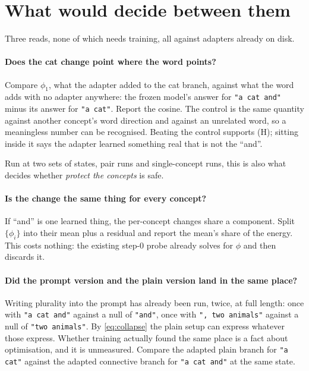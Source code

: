 \documentclass[11pt]{article}
\begin{document}
\section{What would decide between them}

Three reads, none of which needs training, all against adapters already on disk.

\paragraph{Does the cat change point where the word points?}
Compare $\phi_1$, what the adapter added to the cat branch, against what the word adds with no
adapter anywhere: the frozen model's answer for \texttt{"a cat and"} minus its answer for
\texttt{"a cat"}. Report the cosine. The control is the same quantity against another concept's word
direction and against an unrelated word, so a meaningless number can be recognised. Beating the
control supports (H); sitting inside it says the adapter learned something real that is not the
``and''.

Run at two sets of states, pair runs and single-concept runs, this is also what decides whether
\emph{protect the concepts} is safe.

\paragraph{Is the change the same thing for every concept?}
If ``and'' is one learned thing, the per-concept changes share a component. Split $\{\phi_i\}$ into
their mean plus a residual and report the mean's share of the energy. This costs nothing: the
existing step-$0$ probe already solves for $\phi$ and then discards it.

\paragraph{Did the prompt version and the plain version land in the same place?}
Writing plurality into the prompt has already been run, twice, at full length: once with
\texttt{"a cat and"} against a null of \texttt{"and"}, once with \texttt{", two animals"} against a
null of \texttt{"two animals"}. By \eqref{eq:collapse} the plain setup can express whatever those
express. Whether training actually found the same place is a fact about optimisation, and it is
unmeasured. Compare the adapted plain branch for \texttt{"a cat"} against the adapted connective
branch for \texttt{"a cat and"} at the same state.
\end{document}
